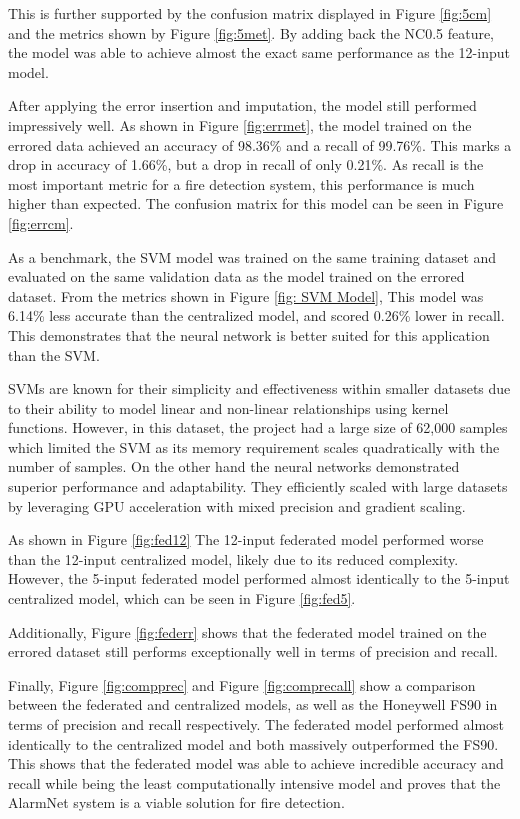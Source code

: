 \documentclass[conference]{IEEEtran}
\begin{document}
This is further supported by the confusion matrix displayed
in Figure \ref{fig:5cm} and the metrics shown by Figure
\ref{fig:5met}. By adding back the NC0.5 feature, the model
was able to achieve almost the exact same performance as the
12-input model. 

After applying the error insertion and imputation, the model
still performed impressively well. As shown in Figure
\ref{fig:errmet}, the model trained on the errored data
achieved an accuracy of 98.36\% and a recall of 99.76\%.
This marks a drop in accuracy of 1.66\%, but a drop in
recall of only 0.21\%. As recall is the most important
metric for a fire detection system, this performance is much
higher than expected. The confusion matrix for this model
can be seen in Figure \ref{fig:errcm}.

As a benchmark, the SVM model was trained on the same
training dataset and evaluated on the same validation data
as the model trained on the errored dataset. From the
metrics shown in Figure \ref{fig: SVM Model}, This model was
6.14\% less accurate than the centralized model, and
scored 0.26\% lower in recall. This demonstrates that the
neural network is better suited for this application than
the SVM. 
 
SVMs are known for their simplicity and effectiveness within
smaller datasets due to their ability to model linear and
non-linear relationships using kernel functions. However, in
this dataset, the project had a large size of 62,000 samples
which limited the SVM as its memory requirement scales
quadratically with the number of samples. On the other hand
the neural networks demonstrated superior performance and
adaptability. They efficiently scaled with large datasets by
leveraging GPU acceleration with mixed precision and
gradient scaling.

As shown in Figure \ref{fig:fed12} The 12-input federated model performed worse than the 12-input centralized model, likely due to its reduced complexity. However, the 5-input federated model performed almost identically to the 5-input centralized model, which can be seen in Figure \ref{fig:fed5}. 

Additionally, Figure \ref{fig:federr} shows that the
federated model trained on the errored dataset still
performs exceptionally well in terms of precision and
recall. 

Finally, Figure \ref{fig:compprec} and Figure \ref{fig:comprecall} show a comparison between the federated and centralized models, as well as the Honeywell FS90 in terms of precision and recall respectively. The federated model performed almost identically to the centralized model and both massively outperformed the FS90. This shows that the federated model was able to achieve incredible accuracy and recall while being the least computationally intensive model and proves that the AlarmNet system is a viable solution for fire detection.
\end{document}
